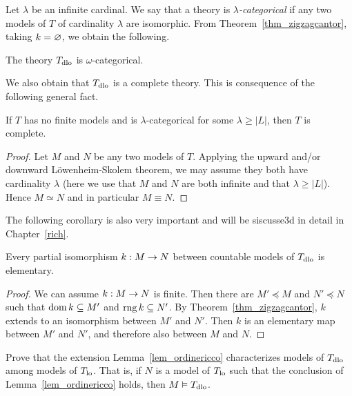 Let $\lambda$ be an infinite cardinal.
We say that a theory is \emph{$\lambda$-categorical\/} if any two models of $T$ of cardinality $\lambda$ are isomorphic.
From Theorem~\ref{thm_zigzagcantor}, taking $k=\0$, we obtain the following.

\begin{corollary}\label{corol_DLO_omegacat}
The theory $T_{\rm dlo}$ is $\omega$-categorical.
\end{corollary}

We also obtain that $T_{\rm dlo}$ is a complete theory.
This is consequence of the following general fact.

\begin{proposition}\label{thm_categorical->complete}
If $T$ has no finite models and is $\lambda$-categorical for some $\lambda\ge|L|$, then $T$ is complete.
\end{proposition}

\begin{proof}
Let $M$ and $N$ be any two models of $T$.
Applying the upward and/or downward L\"owenheim-Skolem theorem, we may assume they both have cardinality $\lambda$ (here we use that $M$ and $N$ are both infinite and that $\lambda\ge|L|$).
Hence $M\simeq N$ and in particular $M\equiv N$.
\end{proof}

The following corollary is also very important and will be siscusse3d in detail in Chapter~\ref{rich}.

\begin{corollary}\label{corol_DLO_QE}
  Every partial isomorphism $k:M\imp N$ between countable models of $T_{\rm dlo}$ is elementary.
\end{corollary}

\begin{proof}
  We can assume $k:M\imp N$ is finite.
  Then there are $M'\preceq M$ and  $N'\preceq N$ such that $\dom k\subseteq M'$ and $\range k\subseteq N'$.
  By Theorem~\ref{thm_zigzagcantor}, $k$ extends to an isomorphism between $M'$ and $N'$.
  Then $k$ is an elementary map between $M'$ and $N'$, and therefore also between $M$ and $N$.
\end{proof}

\begin{exercise}\label{ex_ricco->dlo}
    Prove that the extension Lemma~\ref{lem_ordinericco} characterizes models of $T_{\rm dlo}$ among models of $T_{\rm lo}$.
    That is, if $N$ is a model of $T_{\rm lo}$ such that the conclusion of Lemma~\ref{lem_ordinericco} holds, then $M\models  T_{\rm dlo}$.
\end{exercise}

